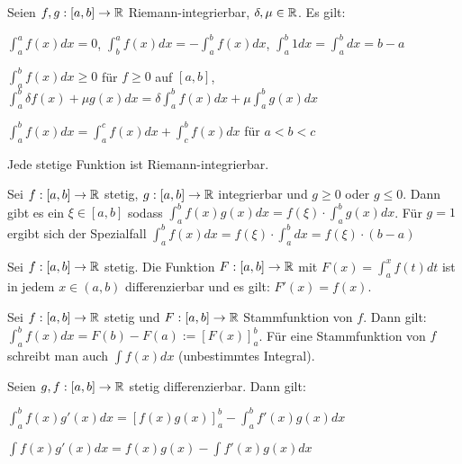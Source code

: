 \documentclass[]{article}
\begin{document}
\begin{satz}
	Seien $f,g : [a,b] \rightarrow \mathbb{R}$ Riemann-integrierbar, $\delta, \mu \in \mathbb{R}$. Es gilt:
	\begin{description}[noitemsep]
		\item $\int_{a}^{a} f(x) dx = 0$, $\int_{b}^{a} f(x) dx = - \int_{a}^{b} f(x) dx$, $\int_{a}^{b} 1 dx = \int_{a}^{b} dx = b - a$
		\item $\int_{a}^{b} f(x) dx \geq 0$ für $f \geq 0$ auf $[a,b]$, $\int_{a}^{b} \delta f(x) + \mu g(x) dx = \delta \int_{a}^{b}f(x) dx + \mu \int_{a}^{b} g(x) dx$
		\item $\int_{a}^{b} f(x) dx = \int_{a}^{c} f(x) dx + \int_{c}^{b} f(x) dx$ für $a < b < c$
	\end{description} 
\end{satz}

\begin{satz}
	Jede stetige Funktion ist Riemann-integrierbar.
\end{satz}

\begin{satz}
	Sei $f : [a,b] \rightarrow \mathbb{R}$ stetig, $g : [a,b] \rightarrow \mathbb{R}$ integrierbar und $g \geq 0$ oder $g \leq 0$. Dann gibt es ein $\xi \in [a,b]$ sodass $\int_{a}^{b}f(x)g(x) dx = f(\xi) \cdot \int_{a}^{b} g(x) dx$. Für $g=1$ ergibt sich der Spezialfall $\int_{a}^{b}f(x)dx = f(\xi) \cdot \int_{a}^{b} dx = f(\xi) \cdot (b - a)$
\end{satz}

\begin{satz}
	Sei $f : [a,b] \rightarrow \mathbb{R}$ stetig. Die Funktion $F : [a,b] \rightarrow \mathbb{R}$ mit $F(x) = \int_{a}^{x} f(t) dt$ ist in jedem $x \in (a,b)$ differenzierbar und es gilt: $F'(x) = f(x)$.
\end{satz}

\begin{satz}
	Sei $f : [a,b] \rightarrow \mathbb{R}$ stetig und $F : [a,b] \rightarrow \mathbb{R}$ Stammfunktion von $f$. Dann gilt: $\int_{a}^{b}f(x)dx = F(b) - F(a) := [F(x)]_a^b$. Für eine Stammfunktion von $f$ schreibt man auch $\int f(x) dx$ (unbestimmtes Integral).
\end{satz}

\begin{satz}
	Seien $g,f : [a,b] \rightarrow \mathbb{R}$ stetig differenzierbar. Dann gilt:
	\begin{description}[noitemsep]
		\item $\int_{a}^{b} f(x)g'(x)dx = [f(x)g(x)]_a^b - \int_{a}^{b} f'(x)g(x)dx$
		\item $\int f(x)g'(x)dx = f(x)g(x) - \int f'(x)g(x)dx$	
	\end{description}
\end{satz}
\end{document}
